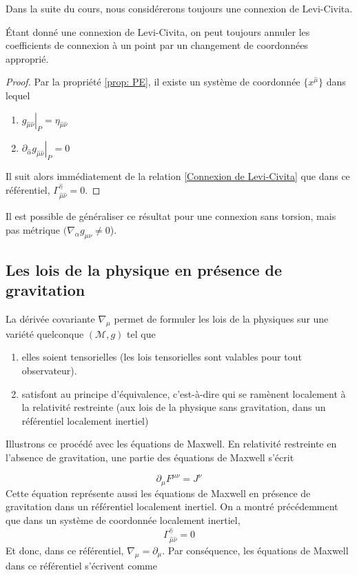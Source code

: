 Dans la suite du cours, nous considérerons toujours une connexion de Levi-Civita.
\begin{theoremframe}
    \begin{propri}
        Étant donné une connexion de Levi-Civita, on peut toujours annuler les coefficients de connexion à un point par un changement de coordonnées approprié. 
    \end{propri}
\end{theoremframe}
\begin{proof}
   Par la propriété \ref{prop: PE}, il existe un système de coordonnée $\{x^{\hat{\mu}}\}$ dans lequel 
    \begin{enumerate}
        \item $\left. g_{\hat{\mu}\hat{\nu}} \right|_P = \eta_{\hat{\mu}\hat{\nu}}$
        \item $ \left. \partial_{\hat{\alpha}}g_{\hat{\mu}\hat{\nu}} \right|_P=0$
    \end{enumerate}
    Il suit alors immédiatement de la relation \ref{Connexion de Levi-Civita} que dans ce référentiel, $ \Gamma^{\hat{\gamma}}_{\hat{\mu} \hat{\nu}} =0$. 
\end{proof}
Il est possible de généraliser ce résultat pour une connexion sans torsion, mais pas métrique $( \nabla_{\alpha}g_{\mu \nu} \neq 0$).
\subsection{Les lois de la physique en présence de gravitation}
La dérivée covariante $\nabla_{\mu}$ permet de formuler les lois de la physiques sur une variété quelconque $(\mathcal{M}, g)$ tel que 

\begin{enumerate}
    \item elles soient tensorielles (les lois tensorielles sont valables pour tout observateur).
    \item satisfont au principe d'équivalence, c'est-à-dire qui se ramènent localement à la relativité restreinte (aux lois de la physique sans gravitation, dans un référentiel localement inertiel)
\end{enumerate}
Illustrons ce procédé avec les équations de Maxwell. En relativité restreinte en l'absence de gravitation, une partie des équations de Maxwell s'écrit

\begin{equation}
    \partial_{\mu}F^{\mu \nu} = J^{\nu}
\label{équation de Mawell 2}
\end{equation}
Cette équation représente aussi les équations de Maxwell en présence de gravitation dans un référentiel localement inertiel. On a montré précédemment que dans un système de coordonnée localement inertiel, 
\begin{equation}
    \Gamma^{\hat{\gamma}}_{\hat{\mu} \hat{\nu}} = 0
\end{equation}
 Et donc, dans ce référentiel, $\nabla_{\mu} = \partial_{\mu}$. Par conséquence, les équations de Maxwell dans ce référentiel s'écrivent comme

